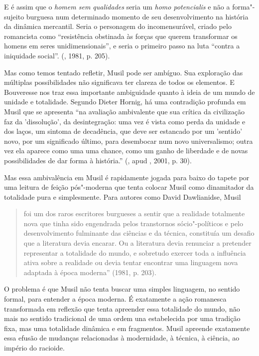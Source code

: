 E é assim que o \emph{homem sem qualidades} seria um \emph{homo
potencialis} e não a forma"-sujeito burguesa num determinado momento de
seu desenvolvimento na história da dinâmica mercantil. Seria o
personagem do incomensurável, criado pelo romancista como ``resistência
obstinada às forças que querem transformar os homens em seres
unidimensionais'', e seria o primeiro passo na luta ``contra a
iniquidade social''. (, 1981, p. 205).

Mas como temos tentado refletir, Musil pode ser ambíguo. Sua exploração
das múltiplas possibilidades não significava ter clareza de todos os
elementos. E Bouveresse nos traz essa importante ambiguidade quanto à
ideia de um mundo de unidade e totalidade. Segundo Dieter Hornig, há uma
contradição profunda em Musil que se apresenta ``na avaliação
ambivalente que sua crítica da civilização faz da 'dissolução', da
desintegração: uma vez é vista como perda da unidade e dos laços, um
sintoma de decadência, que deve ser estancado por um 'sentido' novo, por
um significado último, para desembocar num novo universalismo; outra vez
ela aparece como uma uma chance, como um ganho de liberdade e de novas
possibilidades de dar forma à história.'' (, apud ,
2001, p. 30).

Mas essa ambivalência em Musil é rapidamente jogada para baixo do tapete
por uma leitura de feição pós"-moderna que tenta colocar Musil como
dinamitador da totalidade pura e simplesmente. Para autores como David
Dawlianidse, Musil

\begin{quote}
foi um dos raros escritores burgueses a sentir que a realidade
totalmente nova que tinha sido engendrada pelos transtornos
sócio"-políticos e pelo desenvolvimento fulminante das ciências e da
técnica, constituía um desafio que a literatura devia encarar. Ou a
literatura devia renunciar a pretender representar a totalidade do
mundo, e sobretudo exercer toda a influência ativa sobre a realidade ou
devia tentar encontrar uma linguagem nova adaptada à época moderna''
(1981, p. 203).
\end{quote}

O problema é que Musil não tenta buscar uma simples linguagem, no
sentido formal, para entender a época moderna. É exatamente a ação
romanesca transformada em reflexão que tenta apreender essa totalidade
do mundo, não mais no sentido tradicional de uma ordem una estabelecida
por uma tradição fixa, mas uma totalidade dinâmica e em fragmentos.
Musil apreende exatamente essa efusão de mudanças relacionadas à
modernidade, à técnica, à ciência, ao império do racioide.

